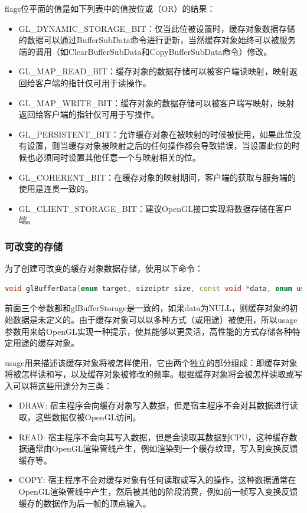 flags位平面的值是如下列表中的值按位或（OR）的结果：

\begin{itemize}
	\item GL\_DYNAMIC\_STORAGE\_BIT：仅当此位被设置时，缓存对象数据存储的数据可以通过BufferSubData命令进行更新，当然缓存对象始终可以被服务端的调用（如ClearBufferSubData和CopyBufferSubData命令）修改。
	\item GL\_MAP\_READ\_BIT：缓存对象的数据存储可以被客户端读映射，映射返回给客户端的指针仅可用于读操作。
	\item GL\_MAP\_WRITE\_BIT：缓存对象的数据存储可以被客户端写映射，映射返回给客户端的指针仅可用于写操作。 
	\item GL\_PERSISTENT\_BIT：允许缓存对象在被映射的时候被使用，如果此位没有设置，则当缓存对象被映射之后的任何操作都会导致错误，当设置此位的时候也必须同时设置其他任意一个与映射相关的位。 
	\item GL\_COHERENT\_BIT：在缓存对象的映射期间，客户端的获取与服务端的使用是连贯一致的。
	\item GL\_CLIENT\_STORAGE\_BIT：建议OpenGL接口实现将数据存储在客户端。
\end{itemize}




\subsubsection{可改变的存储}
为了创建可改变的缓存对象数据存储，使用以下命令：

\begin{lstlisting}[language=C++]
void glBufferData​(enum target, sizeiptr size, const void *data, enum usage);
\end{lstlisting}

前面三个参数都和glBufferStorage是一致的，如果data为NULL，则缓存对象的初始数据是未定义的。由于缓存对象可以以多种方式（或用途）被使用，所以usage参数用来给OpenGL实现一种提示，使其能够以更灵活，高性能的方式存储各种特定用途的缓存对象。

usage用来描述该缓存对象将被怎样使用，它由两个独立的部分组成：即缓存对象将被怎样读和写，以及缓存对象被修改的频率。根据缓存对象将会被怎样读取或写入可以将这些用途分为三类：

\begin{itemize}
	\item DRAW: 宿主程序会向缓存对象写入数据，但是宿主程序不会对其数据进行读取，这些数据仅被OpenGL访问。
	\item READ: 宿主程序不会向其写入数据，但是会读取其数据到CPU，这种缓存数据通常由OpenGL渲染管线产生，例如渲染到一个缓存纹理，写入到变换反馈缓存等。
	\item COPY: 宿主程序不会对缓存对象有任何读取或写入的操作，这种数据通常在OpenGL渲染管线中产生，然后被其他的阶段消费，例如前一帧写入变换反馈缓存的数据作为后一帧的顶点输入。
\end{itemize}

